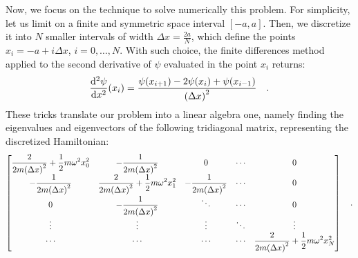 \documentclass[pra, onecolumn, notitlepage, floats, 11pt]{revtex4-1}
\begin{document}
Now, we focus on the technique to solve numerically this problem. For simplicity, let us limit on a finite and symmetric space interval \( [-a,a] \). Then, we discretize it into \( N \) smaller intervals of width \( \Delta x = \frac{2a}{N} \), which define the points \( x_{i} = -a + i\Delta x \), \( i = 0, \dots, N \). With such choice, the finite differences method applied to the second derivative of \( \psi \) evaluated in the point \( x_{i} \) returns:
\begin{equation}
    \dv[2]{\psi}{x} \qty(x_{i})
    =
    \frac{\psi\qty(x_{i+1}) - 2\psi\qty(x_{i}) + \psi\qty(x_{i-1})}{\qty(\Delta x)^2}
    \quad .
    \label{eq:06_T_4}
\end{equation}
These tricks translate our problem into a linear algebra one, namely finding the eigenvalues and eigenvectors of the following tridiagonal matrix, representing the discretized Hamiltonian:
\begin{equation}
    \displaystyle
    \begin{bmatrix}
        \displaystyle \frac{2}{2m\qty(\Delta x)^{2}} + \frac{1}{2}m\omega^{2} x_{0}^2  &
        \displaystyle - \frac{1}{2m\qty(\Delta x)^{2}}  &
        0   &
        \cdots  &
        0   \\
        \displaystyle - \frac{1}{2m\qty(\Delta x)^{2}}  &
        \displaystyle \frac{2}{2m\qty(\Delta x)^{2}} + \frac{1}{2}m\omega^{2} x_{1}^2  &
        \displaystyle - \frac{1}{2m\qty(\Delta x)^{2}}  &
        \cdots  &
        0   \\
        0   &   \displaystyle - \frac{1}{2m\qty(\Delta x)^{2}}  &
        \ddots  &
        \cdots  &
        0   \\
        \vdots  &
        \vdots  &
        \vdots  &
        \ddots  &
        \vdots  \\
        \cdots  &
        \cdots  &
        \cdots  &
        \cdots  &
        \displaystyle \frac{2}{2m\qty(\Delta x)^{2}} + \frac{1}{2}m\omega^{2} x_{N}^2
    \end{bmatrix}
    \quad .
    \label{eq:06_T_5}
\end{equation}
\end{document}
